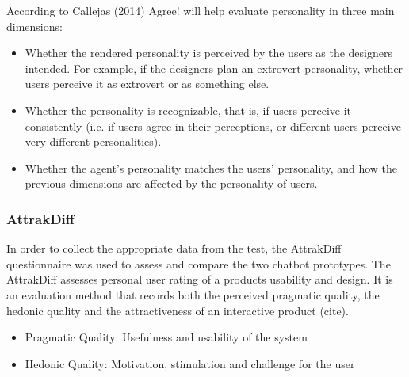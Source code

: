      According to Callejas (2014) Agree! will help evaluate personality in three main dimensions:
    
        \begin{itemize}
            \item Whether the rendered personality is perceived by the users as the designers intended. For example, if the designers plan an extrovert personality, whether users perceive it as extrovert or as something else.
            \item Whether the personality is recognizable, that is, if users perceive it consistently (i.e. if users agree in their perceptions, or different users perceive very different personalities).
            \item Whether the agent's personality matches the users' personality, and how the previous dimensions are affected by the personality of users.
        \end{itemize}
            
    \vspace{5mm} %
   
     \subsubsection{AttrakDiff}
    
    In order to collect the appropriate data from the test, the AttrakDiff questionnaire was used to assess and compare the two chatbot prototypes. The AttrakDiff assesses personal user rating of a products usability and design. It is an evaluation method that records both the perceived pragmatic quality, the hedonic quality and the attractiveness of an interactive product (cite).
    
        \begin{itemize}
            \item Pragmatic Quality: Usefulness and usability of the system
            \item Hedonic Quality: Motivation, stimulation and challenge for the user
        \end{itemize}
    

   